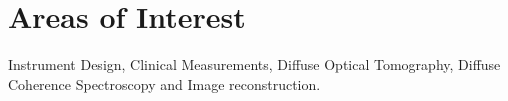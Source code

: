 \documentclass{my_cv}
\begin{document}
\vspace{-2mm}
\begin{center} 
\begin{footnotesize}
\end{footnotesize}

\href{https://www.linkedin.com/in/venkaiahchowdarykavuri}{\textcolor{linkedincolor}{\faLinkedinSquare}} \href{https://github.com/Venki-Kavuri}{\faGithub} \href{https://scholar.google.com/citations?hl=en&user=r5E9ACIAAAAJ&view_op=list_works}{\textcolor{gscholarcolor}{\aiGoogleScholar}} \href{https://www.facebook.com/venki.kavuri}{\textcolor{facebookcolor}{\faFacebookOfficial}}
\end{center} 

\section{Areas of Interest}
Instrument Design, Clinical Measurements, Diffuse Optical Tomography, Diffuse Coherence Spectroscopy and Image reconstruction.
\vspace{-5mm}
\end{document}
